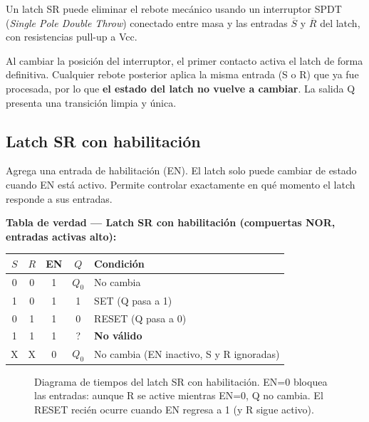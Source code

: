 Un latch SR puede eliminar el rebote mecánico usando un interruptor SPDT (\textit{Single Pole Double Throw}) conectado entre masa y las entradas $\overline{S}$ y $\overline{R}$ del latch, con resistencias pull-up a Vcc.

Al cambiar la posición del interruptor, el primer contacto activa el latch de forma definitiva. Cualquier rebote posterior aplica la misma entrada (S o R) que ya fue procesada, por lo que \textbf{el estado del latch no vuelve a cambiar}. La salida Q presenta una transición limpia y única.



\subsection{Latch SR con habilitación}

Agrega una entrada de habilitación (EN). El latch solo puede cambiar de estado cuando EN está activo. Permite controlar exactamente en qué momento el latch responde a sus entradas.


\textbf{Tabla de verdad --- Latch SR con habilitación (compuertas NOR, entradas activas alto):}

\begin{table}[H]
\centering
\begin{tabular}{ccccp{6.5cm}}
\toprule
$S$ & $R$ & EN & $Q$ & Condición \\
\midrule
0 & 0 & 1 & $Q_0$ & No cambia \\
1 & 0 & 1 & 1     & SET (Q pasa a 1) \\
0 & 1 & 1 & 0     & RESET (Q pasa a 0) \\
1 & 1 & 1 & ?     & \textbf{No válido} \\
X & X & 0 & $Q_0$ & No cambia (EN inactivo, S y R ignoradas) \\
\bottomrule
\end{tabular}
\end{table}

\begin{figure}[H]
\centering

\caption{Diagrama de tiempos del latch SR con habilitación. EN=0 bloquea las entradas:
  aunque R se active mientras EN=0, Q no cambia. El RESET recién ocurre
  cuando EN regresa a 1 (y R sigue activo).}
\end{figure}


